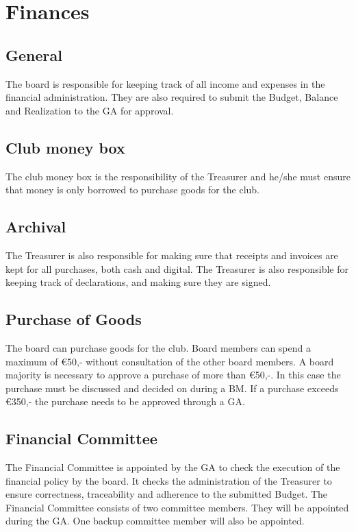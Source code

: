 \documentclass[a4paper]{article}
\begin{document}
\section{Finances}
\subsection{General}
The board is responsible for keeping track of all income and expenses in the financial administration. They are also required to submit the Budget, Balance and Realization to the GA for approval.

\subsection{Club money box}
The club money box is the responsibility of the Treasurer and he/she must ensure that money is only borrowed to purchase goods for the club.

\subsection{Archival}
The Treasurer is also responsible for making sure that receipts and invoices are kept for all purchases, both cash and digital. The Treasurer is also responsible for keeping track of declarations, and making sure they are signed.

\subsection{Purchase of Goods}
The board can purchase goods for the club. Board members can spend a maximum of €50,- without consultation of the other board members. A board majority is necessary to approve a purchase of more than €50,-. In this case the purchase must be discussed and decided on during a BM. If a purchase exceeds €350,- the purchase needs to be approved through a GA.

\subsection{Financial Committee}
The Financial Committee is appointed by the GA to check the execution of the financial policy by the board. It checks the administration of the Treasurer to ensure correctness, traceability and adherence to the submitted Budget. The Financial Committee consists of two committee members. They will be appointed during the GA. One backup committee member will also be appointed.
\end{document}
